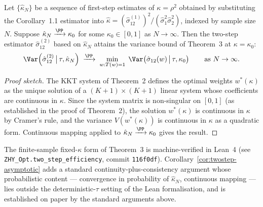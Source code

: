 %
%


\begin{corollary}
\label{cor:twostep-asymptotic}
Let $\{\hat\kappa_N\}$ be a sequence of first-step estimates of $\kappa = \rho^2$
obtained by substituting the Corollary~1.1 estimator into
$\hat\kappa = (\hat\sigma_{12}^{(1)})^2 / (\hat\sigma_1^2 \hat\sigma_2^2)$,
indexed by sample size $N$. Suppose $\hat\kappa_N \xrightarrow{\PP} \kappa_0$
for some $\kappa_0 \in [0,1]$ as $N \to \infty$. Then the two-step estimator
$\hat\sigma_{12}^{(2)}$ based on $\hat\kappa_N$ attains the variance bound of
Theorem~3 at $\kappa = \kappa_0$:
\[
  \Var\!\left(\hat\sigma_{12}^{(2)} \,\big|\, \tau, \hat\kappa_N\right)
  \;\xrightarrow{\PP}\;
  \min_{w : T(w) = 1}\; \Var\!\left(\hat\sigma_{12}(w) \,\big|\, \tau, \kappa_0\right)
  \qquad \text{as } N \to \infty.
\]
\end{corollary}

\begin{proof}[Proof sketch]
The KKT system of Theorem~2 defines the optimal weights $w^*(\kappa)$ as the
unique solution of a $(K{+}1) \times (K{+}1)$ linear system whose coefficients
are continuous in $\kappa$. Since the system matrix is non-singular on
$[0,1]$ (as established in the proof of Theorem~2), the solution
$w^*(\kappa)$ is continuous in $\kappa$ by Cramer's rule, and the
variance $V(w^*(\kappa))$ is continuous in $\kappa$ as a quadratic form.
Continuous mapping applied to $\hat\kappa_N \xrightarrow{\PP} \kappa_0$
gives the result.
\end{proof}

\begin{remark}
The finite-sample fixed-$\kappa$ form of Theorem~3 is machine-verified in
Lean~4 (see \texttt{ZHY\_Opt.two\_step\_efficiency}, commit
\texttt{116f0df}). Corollary~\ref{cor:twostep-asymptotic} adds a standard
continuity-plus-consistency argument whose probabilistic content —
convergence in probability of $\hat\kappa_N$, continuous mapping — lies
outside the deterministic-$\tau$ setting of the Lean formalisation, and
is established on paper by the standard arguments above.
\end{remark}

